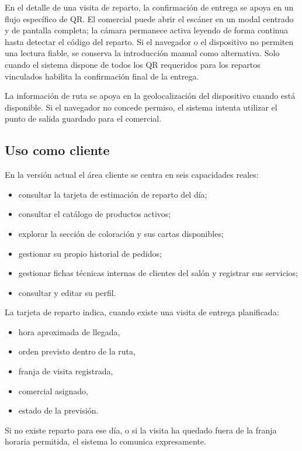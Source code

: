 En el detalle de una visita de reparto, la confirmación de entrega se apoya en un flujo específico de QR. El comercial puede abrir el escáner en un modal centrado y de pantalla completa; la cámara permanece activa leyendo de forma continua hasta detectar el código del reparto. Si el navegador o el dispositivo no permiten una lectura fiable, se conserva la introducción manual como alternativa. Solo cuando el sistema dispone de todos los QR requeridos para los repartos vinculados habilita la confirmación final de la entrega.

La información de ruta se apoya en la geolocalización del dispositivo cuando está disponible. Si el navegador no concede permiso, el sistema intenta utilizar el punto de salida guardado para el comercial.

\subsection{Uso como cliente}

En la versión actual el área cliente se centra en seis capacidades reales:

\begin{itemize}
    \item consultar la tarjeta de estimación de reparto del día;
    \item consultar el catálogo de productos activos;
    \item explorar la sección de coloración y sus cartas disponibles;
    \item gestionar su propio historial de pedidos;
    \item gestionar fichas técnicas internas de clientes del salón y registrar sus servicios;
    \item consultar y editar su perfil.
\end{itemize}

La tarjeta de reparto indica, cuando existe una visita de entrega planificada:

\begin{itemize}
    \item hora aproximada de llegada,
    \item orden previsto dentro de la ruta,
    \item franja de visita registrada,
    \item comercial asignado,
    \item estado de la previsión.
\end{itemize}

Si no existe reparto para ese día, o si la visita ha quedado fuera de la franja horaria permitida, el sistema lo comunica expresamente.

